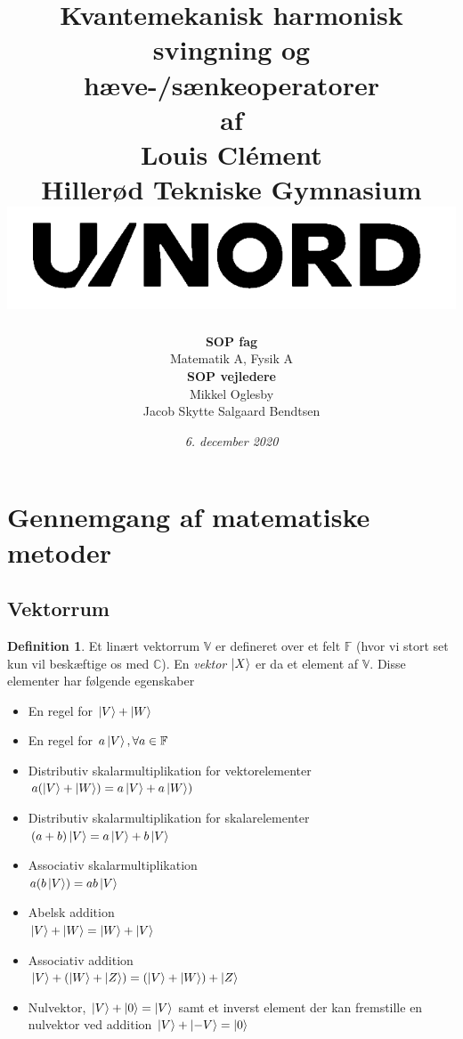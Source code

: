 \documentclass[12pt]{article}
\title{
  {{Kvantemekanisk harmonisk svingning og hæve-/sænkeoperatorer}}\\
  {\small af}\\
  {\large{Louis Clément}}\\
  {\large Hillerød Tekniske Gymnasium}\\
  \vspace{2cm}
  {\includegraphics[scale=1.5]{gym.png}}
  \vspace*{1.5cm}
}
\author{
  \begin{tabular}[!h]{c}
    \textbf{SOP fag}\\
                Matematik A, Fysik A \\
    \textbf{SOP vejledere}\\
                 Mikkel Oglesby \\ Jacob Skytte Salgaard Bendtsen
  \end{tabular}
}
\date{\vspace*{1cm}\textit{6. december 2020}}
\theoremstyle{definition}
\theoremstyle{remark}
\theoremstyle{definition}
\newtheorem{definition}{Definition}[section]
\newcounter{theo}[section]\setcounter{theo}{0}
\numberwithin{equation}{section}
\begin{document}
\maketitle
\newpage
\tableofcontents

\newpage
\setcounter{page}{1}

\section{Gennemgang af matematiske metoder}
\subsection{Vektorrum}
\begin{definition}
  Et linært vektorrum $\mathbb V$ er defineret over et felt $\mathbb F$ (hvor vi stort set kun vil beskæftige os med $\mathbb C$). En \textit{vektor} $\ket X$ er da et element af $\mathbb V$. Disse elementer har følgende egenskaber
  \begin{itemize}
  \item En regel for $\ket V+\ket W$
  \item En regel for $a\ket V, \forall a\in \mathbb F$
  \item Distributiv skalarmultiplikation for vektorelementer\\$a(\ket V+\ket W) = a\ket V+a\ket W)$
  \item Distributiv skalarmultiplikation for skalarelementer\\$(a+b)\ket V = a\ket V + b\ket V$
  \item Associativ skalarmultiplikation\\$a(b\ket V) = ab\ket V$
  \item Abelsk addition\\$\ket V+\ket W=\ket W + \ket V$
  \item Associativ addition\\$\ket V +(\ket W + \ket Z) = (\ket V+\ket W) + \ket Z$
  \item Nulvektor, $\ket V + \ket 0 = \ket V$ samt et inverst element der kan fremstille en nulvektor ved addition $\ket V + \ket{-V} = \ket 0$
  \end{itemize}
\end{definition}
\end{document}
